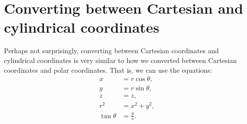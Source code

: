 \documentclass{ximera}
\begin{document}
\begin{image}
\end{image}

\section{Converting between Cartesian and cylindrical coordinates}

Perhaps not surprisingly, converting between Cartesian coordinates and cylindrical coordinates is very similar to how we converted between Cartesian coordinates and polar coordinates. That is, we can use the equations:
\begin{align*}
x &= r\cos\theta, \\
y &= r\sin\theta, \\
z &= z,\\
r^2 &= x^2 + y^2, \\
\tan\theta &= \frac{y}{x}.
\end{align*}
\end{document}
